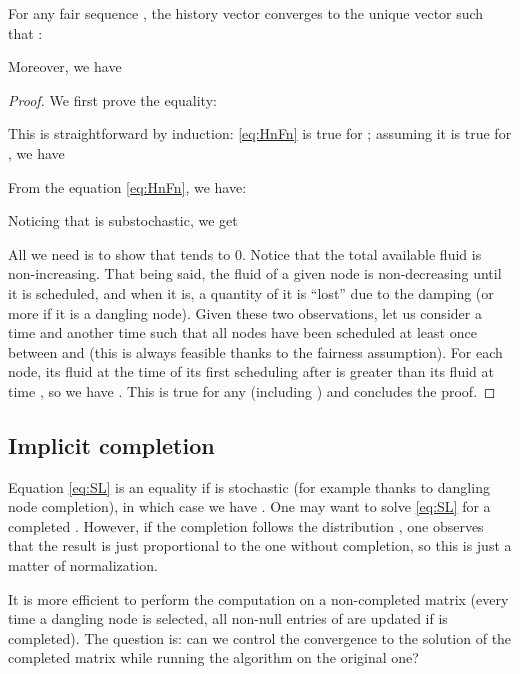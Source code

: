 \documentclass{llncs}
\begin{document}
\begin{theorem}
\label{thm:conv}
For any fair sequence , the history vector  converges to the unique vector  such that :


Moreover, we have



\end{theorem}

\begin{proof}

We first prove the equality:


This is straightforward by induction:  \eqref{eq:HnFn} is true for ; assuming it is true for , we have



From the equation \ref{eq:HnFn}, we have:



Noticing that  is substochastic, we get 



All we need is to show that  tends to 0. Notice that the total available fluid is non-increasing. That being said, the fluid of a given node is non-decreasing until it is scheduled, and when it is, a quantity  of it is ``lost'' due to the damping (or more if it is a dangling node). Given these two observations, let us consider a time  and another time  such that all nodes have been scheduled at least once between  and  (this is always feasible thanks to the fairness assumption). For each node, its fluid at the time of its first scheduling after  is greater than its fluid at time , so we have . This is true for any  (including ) and concludes the proof.
\end{proof}



\subsection{Implicit completion}



\label{ss:distance}

Equation \eqref{eq:SL} is an equality if  is stochastic (for example thanks to dangling node completion), in which case we have  . 
One may want to solve \eqref{eq:SL} for a completed . However, if the completion follows the distribution , one observes that the result is just proportional to the one without completion, so this is just a matter of normalization.

It is more efficient  to perform the computation on a non-completed matrix (every time a dangling node is selected, all non-null entries of  are updated if  is completed). The question is: can we control the convergence to the solution of the completed matrix while running the algorithm on the original one?
\end{document}
